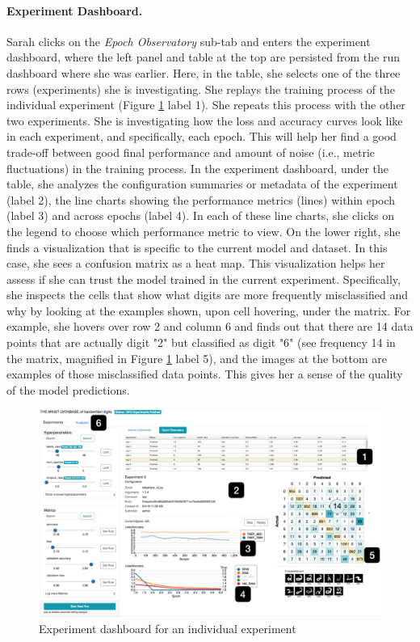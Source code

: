 \documentclass[preprint]{vgtc}        %
\begin{document}
\paragraph{Experiment Dashboard.} Sarah clicks on the \textit{Epoch Observatory} sub-tab and enters the experiment dashboard, where the left panel and table at the top are persisted from the run dashboard where she was earlier. Here, in the table, she selects one of the three rows (experiments) she is investigating. She replays the training process of the individual experiment (Figure \ref{fig:local} label 1). She repeats this process with the other two experiments. She is investigating how the loss and accuracy curves look like in each experiment, and specifically, each epoch. This will help her find a good trade-off between good final performance and amount of noise (i.e., metric fluctuations) in the training process. In the experiment dashboard, under the table, she analyzes the configuration summaries or metadata of the experiment (label 2), the line charts showing the performance metrics (lines) within epoch (label 3) and across epochs (label 4). In each of these line charts, she clicks on the legend to choose which performance metric to view. On the lower right, she finds a visualization that is specific to the current model and dataset. In this case, she sees a confusion matrix as a heat map. This visualization helps her assess if she can trust the model trained in the current experiment. Specifically, she inspects the cells that show what digits are more frequently misclassified and why by looking at the examples shown, upon cell hovering, under the matrix. For example, she hovers over row 2 and column 6 and finds out that there are 14 data points that are actually digit "2" but classified as digit "6" (see frequency 14 in the matrix, magnified in Figure \ref{fig:local} label 5), and the images at the bottom are examples of those misclassified data points. This gives her a sense of the quality of the model predictions.
\begin{figure}
 \includegraphics[width=\columnwidth]{pictures/epoch}
 \caption{Experiment dashboard for an individual experiment}
 \label{fig:local}
\end{figure}
\end{document}
